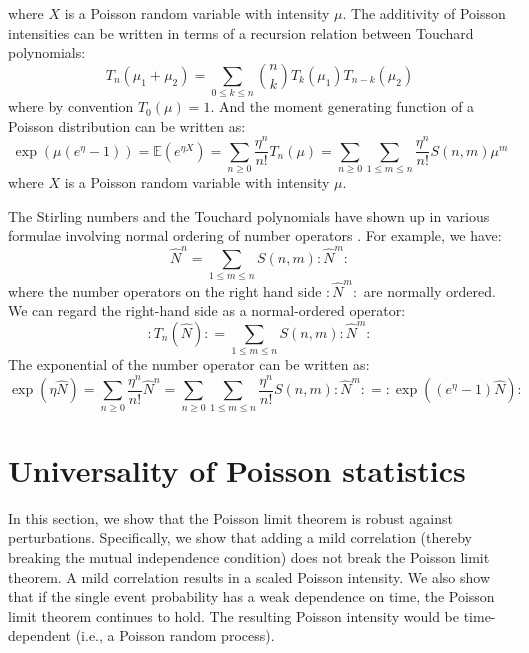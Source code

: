 \documentclass[a4paper,11pt]{article}
\theoremstyle{definition}
\numberwithin{equation}{section}
\begin{document}
where $X$ is a Poisson random variable with intensity $\mu$. The additivity of Poisson intensities can be written in terms of a recursion relation between Touchard polynomials:
\begin{equation}
    T_n(\mu_1 + \mu_2) = \sum_{0\leq k\leq n}\binom{n}{k}T_k(\mu_1)T_{n - k}(\mu_2)
\end{equation}
where by convention $T_0(\mu) = 1$. And the moment generating function of a Poisson distribution can be written as:
\begin{equation}
    \exp(\mu(e^{\eta} - 1)) = \mathbb{E}(e^{\eta X}) = \sum_{n\geq 0}\frac{\eta^n}{n!}T_n(\mu) = \sum_{n\geq 0}\sum_{1\leq m\leq n}\frac{\eta^n}{n!}S(n,m)\mu^m
\end{equation}
where $X$ is a Poisson random variable with intensity $\mu$.

The Stirling numbers and the Touchard polynomials have shown up in various formulae involving normal ordering of number operators \cite{mansour2016commutation}. For example, we have:
\begin{equation}
    \widehat{N}^n = \sum_{1\leq m \leq n}S(n,m):\widehat{N}^m:
\end{equation}
where the number operators on the right hand side $:\widehat{N}^m:$ are normally ordered. We can regard the right-hand side as a normal-ordered operator:
\begin{equation}
    :T_n(\widehat{N}): = \sum_{1\leq m\leq n}S(n,m):\widehat{N}^m:
\end{equation}
The exponential of the number operator can be written as:
\begin{equation}
    \exp(\eta\widehat{N}) = \sum_{n\geq 0}\frac{\eta^n}{n!}\widehat{N}^n = \sum_{n\geq0}\sum_{1\leq m\leq n}\frac{\eta^n}{n!}S(n,m):\widehat{N}^m:   =:\exp((e^{\eta} - 1)\widehat{N}):
\end{equation}
\section{Universality of Poisson statistics}\label{app:universalityPoisson}

In this section, we show that the Poisson limit theorem is robust against perturbations. Specifically, we show that adding a mild correlation (thereby breaking the mutual independence condition) does not break the Poisson limit theorem. A mild correlation results in a scaled Poisson intensity. We also show that if the single event probability has a weak dependence on time, the Poisson limit theorem continues to hold. The resulting Poisson intensity would be time-dependent (i.e., a Poisson random process).
\end{document}
